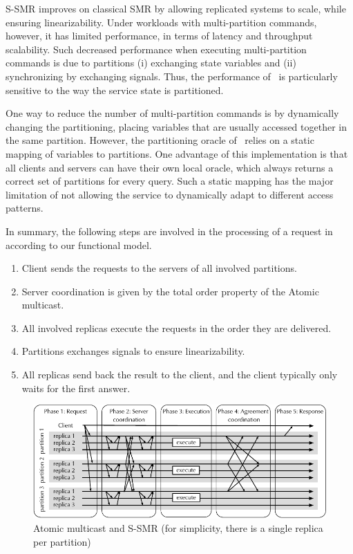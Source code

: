 S-SMR improves on classical SMR by allowing replicated systems to scale, while
ensuring linearizability. Under workloads with multi-partition commands,
however, it has limited performance, in terms of latency and throughput
scalability. Such decreased performance when executing multi-partition commands
is due to partitions (i) exchanging state variables and (ii) synchronizing by
exchanging signals. Thus, the performance of \ssmr\ is particularly
sensitive to the way the service state is partitioned.

One way to reduce the number of multi-partition commands is by dynamically
changing the partitioning, placing variables that are usually accessed together
in the same partition. However, the partitioning oracle of \ssmr\ relies on a
static mapping of variables to partitions. One advantage of this implementation
is that all clients and servers can have their own local oracle, which always
returns a correct set of partitions for every query. Such a static mapping has
the major limitation of not allowing the service to dynamically adapt to
different access patterns.

In summary, the following steps are involved in the processing of a request in
\ssmr\, according to our functional model.

\begin{enumerate}
  \item Client sends the requests to the servers of all involved partitions.
  \item Server coordination is given by the total order property of the Atomic
  multicast.
  \item All involved replicas execute the requests in the order they are delivered.
  \item Partitions exchanges signals to ensure linearizability.
  \item All replicas send back the result to the client, and the client
  typically only waits for the first answer.
\end{enumerate}

\begin{figure}
  \begin{minipage}[b]{1.0\linewidth}
  \centering
        \includegraphics[width=1\linewidth]{figures/coordination-ssmr}
  \end{minipage}
  \caption{Atomic multicast and S-SMR (for simplicity, there is a single replica per partition)}
  \label{fig:coordination-ssmr}
\end{figure}

